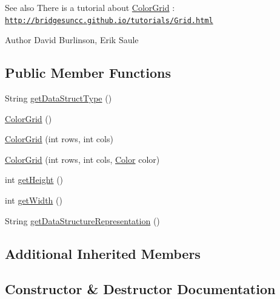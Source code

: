 \begin{DoxySeeAlso}{See also}
There is a tutorial about \hyperlink{classbridges_1_1base_1_1_color_grid}{Color\+Grid} \+: \href{http://bridgesuncc.github.io/tutorials/Grid.html}{\tt http\+://bridgesuncc.\+github.\+io/tutorials/\+Grid.\+html}
\end{DoxySeeAlso}
\begin{DoxyAuthor}{Author}
David Burlinson, Erik Saule 
\end{DoxyAuthor}
\subsection*{Public Member Functions}
\begin{DoxyCompactItemize}
\item 
String \hyperlink{classbridges_1_1base_1_1_color_grid_a53a1f3f105f8545796f98e5fac559b5b}{get\+Data\+Struct\+Type} ()
\item 
\hyperlink{classbridges_1_1base_1_1_color_grid_af434a5a3dcbaf86e51ac6f9e1c1d7e5f}{Color\+Grid} ()
\item 
\hyperlink{classbridges_1_1base_1_1_color_grid_aafb4157a4c8129f30c1f989fcdfda544}{Color\+Grid} (int rows, int cols)
\item 
\hyperlink{classbridges_1_1base_1_1_color_grid_aef40242c93b66ab851e6afa64cada0b5}{Color\+Grid} (int rows, int cols, \hyperlink{classbridges_1_1base_1_1_color}{Color} color)
\item 
int \hyperlink{classbridges_1_1base_1_1_color_grid_a8793791e35f03b3e5a2e5ef3606ac124}{get\+Height} ()
\item 
int \hyperlink{classbridges_1_1base_1_1_color_grid_af872226de86ac8e8f2553fdc5bddc375}{get\+Width} ()
\item 
String \hyperlink{classbridges_1_1base_1_1_color_grid_a81ca0995d17b6cb31122b718dfa57286}{get\+Data\+Structure\+Representation} ()
\end{DoxyCompactItemize}
\subsection*{Additional Inherited Members}


\subsection{Constructor \& Destructor Documentation}
\mbox{\label{classbridges_1_1base_1_1_color_grid_af434a5a3dcbaf86e51ac6f9e1c1d7e5f}} 
